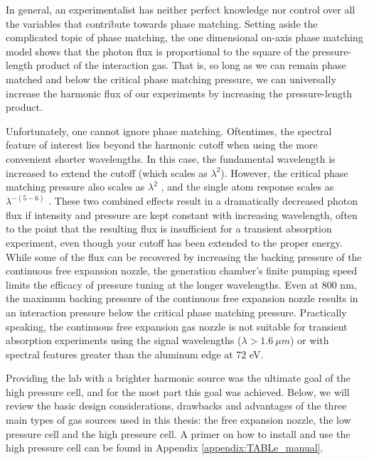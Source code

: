 In general, an experimentalist has neither perfect knowledge nor control over all the variables that contribute towards phase matching. Setting aside the complicated topic of phase matching, the one dimensional on-axis phase matching model\cite{constantOptimizingHighHarmonic1999} shows that the photon flux is proportional to the square of the pressure-length product of the interaction gas. That is, so long as we can remain phase matched and below the critical phase matching pressure\cite{popmintchevPhaseMatchingHigh2009}, we can universally increase the harmonic flux of our experiments by increasing the pressure-length product.

Unfortunately, one cannot ignore phase matching. Oftentimes, the spectral feature of interest lies beyond the harmonic cutoff when using the more convenient shorter wavelengths. In this case, the fundamental wavelength is increased to extend the cutoff (which scales as $\lambda^2$). However, the critical phase matching pressure also scales as $\lambda^2$ \cite{popmintchevPhaseMatchingHigh2009}, and the single atom response scales as $\lambda^{-(5-6)}$ \cite{tateScalingWavePacketDynamics2007}. These two combined effects result in a dramatically decreased photon flux if intensity and pressure are kept constant with increasing wavelength, often to the point that the resulting flux is insufficient for a transient absorption experiment, even though your cutoff has been extended to the proper energy. While some of the flux can be recovered by increasing the backing pressure of the continuous free expansion nozzle, the generation chamber's finite pumping speed limits the efficacy of pressure tuning at the longer wavelengths. Even at 800 nm, the maximum backing pressure of the continuous free expansion nozzle results in an interaction pressure below the critical phase matching pressure. Practically speaking, the continuous free expansion gas nozzle is not suitable for transient absorption experiments using the signal wavelengths ($\lambda > 1.6 \ \mu m$) or with spectral features greater than the aluminum edge at 72 eV.

Providing the lab with a brighter harmonic source was the ultimate goal of the high pressure cell, and for the most part this goal was achieved. Below, we will review the basic design considerations, drawbacks and advantages of the three main types of gas sources used in this thesis: the free expansion nozzle, the low pressure cell and the high pressure cell. A primer on how to install and use the high pressure cell can be found in Appendix \ref{appendix:TABLe_manual}.

